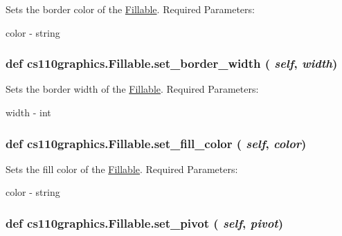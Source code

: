 Sets the border color of the \hyperlink{classcs110graphics_1_1Fillable}{Fillable}. Required Parameters:
\begin{DoxyItemize}
\item color -\/ string 
\end{DoxyItemize}\hypertarget{classcs110graphics_1_1Fillable_a09f05462cb2ed38fdccb244340f05b2b}{
\subsubsection[{set\_\-border\_\-width}]{\setlength{\rightskip}{0pt plus 5cm}def cs110graphics.Fillable.set\_\-border\_\-width ( {\em self}, \/   {\em width})}}
\label{classcs110graphics_1_1Fillable_a09f05462cb2ed38fdccb244340f05b2b}


Sets the border width of the \hyperlink{classcs110graphics_1_1Fillable}{Fillable}. Required Parameters:
\begin{DoxyItemize}
\item width -\/ int 
\end{DoxyItemize}\hypertarget{classcs110graphics_1_1Fillable_a4f24c7186c8d057e42a0209eb1d56be7}{
\subsubsection[{set\_\-fill\_\-color}]{\setlength{\rightskip}{0pt plus 5cm}def cs110graphics.Fillable.set\_\-fill\_\-color ( {\em self}, \/   {\em color})}}
\label{classcs110graphics_1_1Fillable_a4f24c7186c8d057e42a0209eb1d56be7}


Sets the fill color of the \hyperlink{classcs110graphics_1_1Fillable}{Fillable}. Required Parameters:
\begin{DoxyItemize}
\item color -\/ string 
\end{DoxyItemize}\hypertarget{classcs110graphics_1_1Fillable_a2a6066d1a11c0854ff5ee85e7d9ceb54}{
\subsubsection[{set\_\-pivot}]{\setlength{\rightskip}{0pt plus 5cm}def cs110graphics.Fillable.set\_\-pivot ( {\em self}, \/   {\em pivot})}}
\label{classcs110graphics_1_1Fillable_a2a6066d1a11c0854ff5ee85e7d9ceb54}


